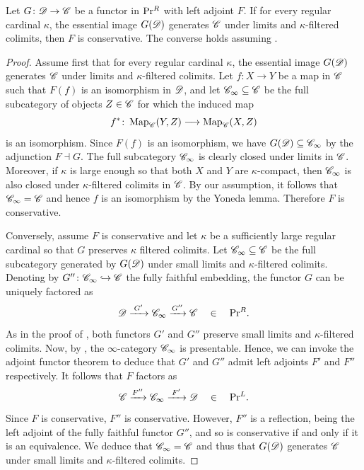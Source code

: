 \documentclass[english]{article}
\begin{document}
\begin{prop}\label{PrR_Epi_Mono}
    Let $G\colon \mathscr{D} \to \mathscr{C}$ be a functor in $\mathrm{Pr}{}^R$ with left adjoint $F$. If for every regular cardinal $\kappa$, the essential image $G(\mathscr{D})$ generates $\mathscr{C}$ under limits and $\kappa$-filtered colimits, then $F$ is conservative. The converse holds assuming .
\end{prop}
\begin{proof}
    Assume first that for every regular cardinal $\kappa$, the essential image $G(\mathscr{D})$ generates $\mathscr{C}$ under limits and $\kappa$-filtered colimits. Let $f\colon X \to Y$ be a map in $\mathscr{C}$ such that $F(f)$ is an isomorphism in $\mathscr{D}$, and let $\mathscr{C}_\infty\subseteq \mathscr{C}$ be the full subcategory of objects $Z\in\mathscr{C}$ for which the induced map 
    \[
        f^*\colon \operatorname{Map}_{\mathscr{C}}(Y,Z) \longrightarrow \operatorname{Map}_{\mathscr{C}}(X,Z)
    \]
    is an isomorphism. Since $F(f)$ is an isomorphism, we have $G(\mathscr{D})\subseteq \mathscr{C}_\infty$ by the adjunction $F\dashv G$. The full subcategory $\mathscr{C}_\infty$ is clearly closed under limits in $\mathscr{C}$. Moreover, if $\kappa$ is large enough so that both $X$ and $Y$ are $\kappa$-compact, then $\mathscr{C}_\infty$ is also closed under $\kappa$-filtered colimits in $\mathscr{C}$. By our assumption, it follows that $\mathscr{C}_\infty = \mathscr{C}$ and hence $f$ is an isomorphism by the Yoneda lemma. Therefore $F$ is conservative.
    
    Conversely, assume $F$ is conservative and let $\kappa$ be a sufficiently large regular cardinal so that $G$ preserves $\kappa$ filtered colimits. Let $\mathscr{C}_\infty \subseteq \mathscr{C}$ be the full subcategory generated by $G(\mathscr{D})$ under small limits and $\kappa$-filtered colimits. Denoting by $G''\colon \mathscr{C}_\infty \hookrightarrow \mathscr{C}$ the fully faithful embedding, the functor $G$ can be uniquely factored as
    \[
        \mathscr{D}  \xrightarrow{\;G'\;} \mathscr{C}_\infty \xrightarrow{G''} \mathscr{C}
        \quad\in\quad \mathrm{Pr}{}^R.
    \] 
    As in the proof of , both functors $G'$ and $G''$ preserve small limits and $\kappa$-filtered colimits. Now, by , the $\infty$-category $\mathscr{C}_\infty$ is presentable. Hence, we can invoke the adjoint functor theorem to deduce that $G'$ and $G''$ admit left adjoints $F'$ and $F''$ respectively. It follows that $F$ factors as
    \[
        \mathscr{C} \xrightarrow{F''} \mathscr{C}_\infty \xrightarrow{\;F'\;} \mathscr{D}
        \quad\in\quad \mathrm{Pr}{}^L.
    \]
    Since $F$ is conservative, $F''$ is conservative. However, $F''$ is a reflection, being the left adjoint of the fully faithful functor $G''$, and so is conservative if and only if it is an equivalence. We deduce that $\mathscr{C}_\infty = \mathscr{C}$ and thus that $G(\mathscr{D})$ generates $\mathscr{C}$ under small limits and $\kappa$-filtered colimits.
\end{proof}
\end{document}
